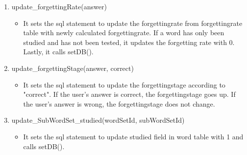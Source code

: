 \documentclass[conference]{IEEEtran}
\begin{document}
\begin{enumerate}
\begin{enumerate}
\begin{enumerate}
\begin{enumerate}
\begin{itemize}
                            \end{itemize}
                        \item update\_forgettingRate(answer)
                            \begin{itemize}
                                \item It sets the sql statement to update the forgettingrate from forgettingrate table with newly calculated forgettingrate. If a word has only been studied and has not been tested, it updates the forgetting rate with 0. Lastly, it calls setDB(). 
                            \end{itemize}
                        \item update\_forgettingStage(answer, correct)
                            \begin{itemize}
                                \item It sets the sql statement to update the forgettingstage according to "correct". If the user's answer is correct, the forgettingstage goes up. If the user's answer is wrong, the forgettingstage does not change.  
                            \end{itemize}
                        \item update\_SubWordSet\_studied(wordSetId, subWordSetId)
                            \begin{itemize}
                                \item It sets the sql statement to update studied field in word table with 1 and calls setDB().
                            \end{itemize}
                    \end{enumerate}
                

\end{enumerate}
\end{enumerate}
\end{enumerate}
\end{document}
